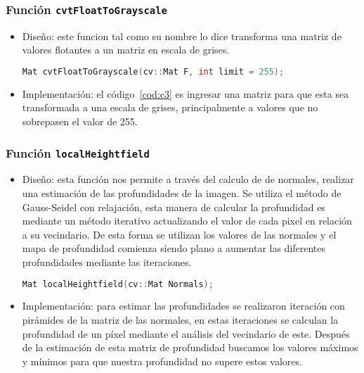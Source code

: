 \documentclass[twocolumn,11pts]{IEEEtran}
\begin{document}
\subsubsection{Función \texttt{cvtFloatToGrayscale}}
\begin{itemize}
\item Diseño: este funcion tal como su nombre lo dice transforma una matriz de valores flotantes a un matriz en escala de grises.

\begin{lstlisting}[float,language=C++,caption={Prototipo función \texttt{cvtFloatToGrayscale}.},label=cod:c3]
Mat cvtFloatToGrayscale(cv::Mat F, int limit = 255);
\end{lstlisting}

\item Implementación: el código~\ref{cod:c3} es ingresar una matriz para que esta sea transformada a una escala de grises, principalmente a valores que no sobrepasen el valor de 255.

\end{itemize}
\subsubsection{Función \texttt{localHeightfield}}
\begin{itemize}
\item Diseño: esta función nos permite a través del calculo de de normales, realizar una estimación de las profundidades de la imagen. Se utiliza el método de Gauss-Seidel con relajación, esta manera de calcular la profundidad es mediante un método iterativo actualizando el valor de cada pixel en relación a su vecindario. De esta forma se utilizan los valores de las normales y el mapa de profundidad comienza siendo plano a aumentar las diferentes profundidades mediante las iteraciones.
\begin{lstlisting}[float,language=C++,caption={Prototipo función \texttt{localHeigthfield}.},label=cod:c4]
Mat localHeightfield(cv::Mat Normals);
\end{lstlisting}
\item Implementación: para estimar las profundidades se realizaron iteración con pirámides de la matriz de las normales, en estas iteraciones se calculan la profundidad de un píxel mediante el análisis del vecindario de este. Después de la estimación de esta matriz de profundidad buscamos los valores máximos y mínimos para que nuestra profundidad no supere estos valores.
\end{itemize}
\end{document}
